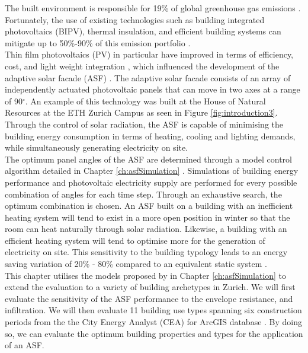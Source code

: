 
The built environment is responsible for 19\% of global greenhouse gas emissions \cite{IPCC}. Fortunately, the use of existing technologies such as building integrated photovoltaics (BIPV), thermal insulation, and efficient building systems can mitigate up to 50\%-90\% of this emission portfolio \cite{IPCC}.\\

Thin film photovoltaics (PV) in particular have improved in terms of efficiency, cost, and light weight integration \cite{NREL, kushiya2014cis, kaelin2004low, jelle2012building}, which influenced the development of the adaptive solar facade (ASF) \cite{nagy2016adaptive}. The adaptive solar facade consists of an array of independently actuated photovoltaic panels that can move in two axes at a range of 90$^{\circ}$. An example of this technology was built at the House of Natural Resources at the ETH Zurich Campus as seen in Figure \ref{fig:introduction3}. Through the control of solar radiation, the ASF is capable of minimising the building energy consumption in terms of heating, cooling and lighting demands, while simultaneously generating electricity on site.\\

The optimum panel angles of the ASF are determined through a model control algorithm detailed in Chapter  \ref{ch:asfSimulation} \cite{jayathissa2017AE}. Simulations of building energy performance and photovoltaic electricity supply are performed for every possible combination of angles for each time step. Through an exhaustive search, the optimum combination is chosen. An ASF built on a  building with an inefficient heating system will tend to exist in a more open position in winter so that the room can heat naturally through solar radiation. Likewise, a building with an efficient heating system will tend to optimise more for the generation of electricity on site. This sensitivity to the building typology leads to an energy saving variation of 20\% - 80\% compared to an equivalent static system \cite{jayathissa2017AE, jayathissa2016PVSEC}. \\

This chapter utilises the models proposed by in Chapter  \ref{ch:asfSimulation} to extend the evaluation to a variety of building archetypes in Zurich. We will first evaluate the sensitivity of the ASF performance to the envelope resistance, and infiltration. We will then evaluate 11 building use types spanning six construction periods from the the City Energy Analyst (CEA) for ArcGIS database \cite{fonseca2016city}. By doing so, we can evaluate the optimum building properties and types for the application of an ASF. \\



